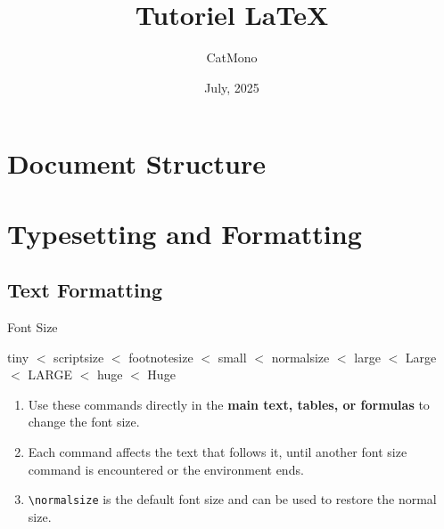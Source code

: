 \documentclass[11pt]{elegantbook}
\title{Tutoriel \LaTeX} %
\author{CatMono} %
\date{July, 2025} %
\begin{document}
\maketitle %

\frontmatter        %
\tableofcontents    %


\mainmatter         %

\chapter{Document Structure} %

\chapter{Typesetting and Formatting}

\section{Text Formatting}

\begin{leftbarTitle}{Font Size}\end{leftbarTitle} 
\tiny  tiny \(<\)
\scriptsize  scriptsize \(<\)
\footnotesize  footnotesize \(<\)
\small  small \(<\)
\normalsize  normalsize \(<\)
\large  large \(<\)
\Large  Large \(<\)
\LARGE  LARGE \(<\)
\huge  huge \(<\)
\Huge Huge 

\normalsize %

\begin{note}
    \begin{enumerate}
        \item Use these commands directly in the \textbf{main text, tables, or formulas} to change the font size.
        \item Each command affects the text that follows it, until another font size command is encountered or the environment ends.
        \item \lstinline|\normalsize| is the default font size and can be used to restore the normal size.
    \end{enumerate}
\end{note}
\end{document}
